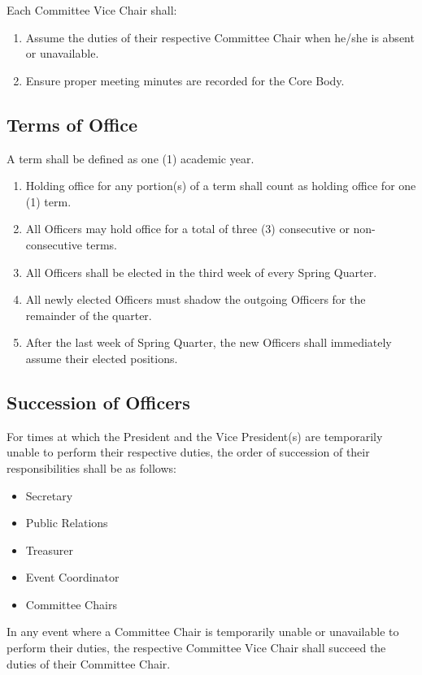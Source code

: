 \documentclass{article}
\newenvironment{li}{
\begin{enumerate}
  \setlength{\itemsep}{1pt}
  \setlength{\parskip}{0pt}
  \setlength{\parsep}{0pt}
}{\end{enumerate}}
\begin{document}
\begin{enumerate}[A.]
\noindent Each Committee Vice Chair shall:
\begin{li}
\item Assume the duties of their respective Committee Chair when he/she is absent or unavailable. 
\item Ensure proper meeting minutes are recorded for the Core Body.
\end{li}

\end{enumerate}

\subsection{Terms of Office}
A term shall be defined as one (1) academic year.
\begin{li}
\item Holding office for any portion(s) of a term shall count as holding office for one (1) term.
\item All Officers may hold office for a total of three (3) consecutive or non-consecutive terms.
\item All Officers shall be elected in the third week of every Spring Quarter.
\item All newly elected Officers must shadow the outgoing Officers for the remainder of the quarter.
\item After the last week of Spring Quarter, the new Officers shall immediately assume their elected positions.
\end{li}

\subsection{Succession of Officers}
For times at which the President and the Vice President(s) are temporarily unable to perform their respective duties, the order of succession of their responsibilities shall be as follows:
\begin{itemize}
  \setlength{\itemsep}{1pt}
  \setlength{\parskip}{0pt}
  \setlength{\parsep}{0pt}
\item Secretary
\item Public Relations
\item Treasurer
\item Event Coordinator
\item Committee Chairs
\end{itemize}
In any event where a Committee Chair is temporarily unable or unavailable to perform their duties, the respective Committee Vice Chair shall succeed the duties of their Committee Chair.\\
\end{document}
